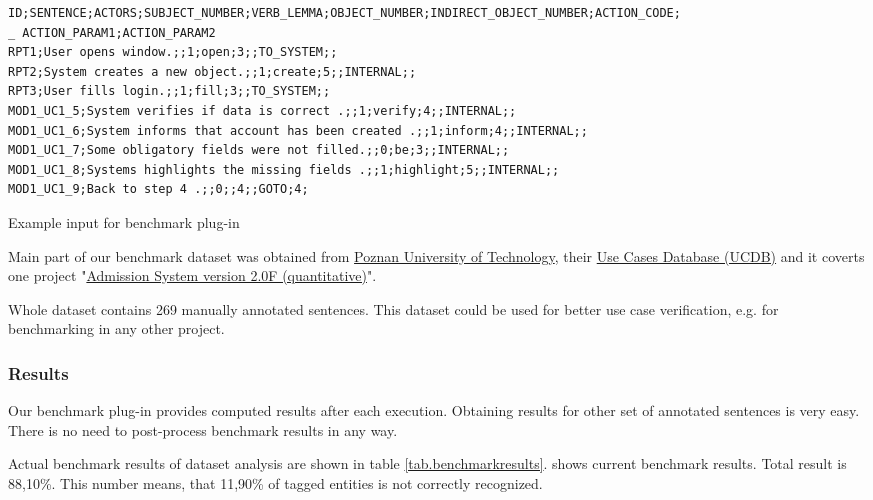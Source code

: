 \begin{table}[ht]   %
\begin{center}
    \begin{scriptsize}  
    \begin{verbatim}      
ID;SENTENCE;ACTORS;SUBJECT_NUMBER;VERB_LEMMA;OBJECT_NUMBER;INDIRECT_OBJECT_NUMBER;ACTION_CODE;
_ ACTION_PARAM1;ACTION_PARAM2
RPT1;User opens window.;;1;open;3;;TO_SYSTEM;;
RPT2;System creates a new object.;;1;create;5;;INTERNAL;;
RPT3;User fills login.;;1;fill;3;;TO_SYSTEM;;
MOD1_UC1_5;System verifies if data is correct .;;1;verify;4;;INTERNAL;;
MOD1_UC1_6;System informs that account has been created .;;1;inform;4;;INTERNAL;;
MOD1_UC1_7;Some obligatory fields were not filled.;;0;be;3;;INTERNAL;;
MOD1_UC1_8;Systems highlights the missing fields .;;1;highlight;5;;INTERNAL;;
MOD1_UC1_9;Back to step 4 .;;0;;4;;GOTO;4;
    \end{verbatim}
    \end{scriptsize}
  \caption{Example input for benchmark plug-in}
  \label{tab.benchmarkinput}
\end{center}
\end{table}      
      
Main part of our benchmark dataset was obtained from \href{http://www2.put.poznan.pl/en}{Poznan University of Technology}, their \href{http://www.se.cs.put.poznan.pl/knowledge-base/software-projects-database/use-cases-database-ucdb/use-cases-database-ucdb}{Use Cases Database (UCDB)} and it coverts one project "\href{http://ucdb.cs.put.poznan.pl/benchmark/2.f.n/srs/index.html}{Admission System version 2.0F (quantitative)}".  

Whole dataset contains 269 manually annotated sentences. This dataset could be used for better use case verification, e.g. for benchmarking in any other project.   

\subsubsection{Results}
Our benchmark plug-in provides computed results after each execution. Obtaining results for other set of annotated sentences is very easy. There is no need to post-process benchmark results in any way.

Actual benchmark results of dataset analysis are shown in table \ref{tab.benchmarkresults}. shows current benchmark results. Total result is 88,10\%. This number means, that 11,90\% of tagged entities is not correctly recognized.

